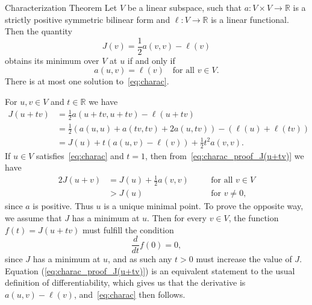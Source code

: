 
\begin{thmx}{Characterization Theorem}
    Let $V$ be a linear subspace, such that
        \(
            a: V \times V \rightarrow \mathbb{R}
        \) 
    is a strictly positive symmetric bilinear form
     and
        \(
            \ell: V \rightarrow \mathbb{R}
        \)
    is a linear functional. Then the quantity
        \[
            J(v)=\frac{1}{2} a(v,v) - \ell(v)
        \]
    obtains its minimum over $V$ at $u$ if and only if
        \begin{equation}
            a(u,v) = \ell(v) \quad \text{for all } v \in V.
        \label{eq:charac}
        \end{equation}
    There is at most one solution to~\eqref{eq:charac}.\label{thm:charac_theorem}
\end{thmx}

\begin{bev}
    For $u,v \in V$ and $t \in \mathbb{R}$ we have
    \begin{align}
        J(u+tv) &= \frac{1}{2} a(u+tv,u+tv) - \ell(u+tv) \nonumber \\
        &= \frac{1}{2} \left( a(u,u) + a(tv,tv) + 2a(u,tv) \right) - \left(  \ell(u) + \ell(tv)\right) \nonumber \\
        &= J(u) + t\left( a(u,v) - \ell(v) \right) + \frac{1}{2}t^2a(v,v). \label{eq:charac_proof_J(u+tv)}
    \end{align}
    If $u \in V$ satisfies~\eqref{eq:charac} and $t=1$, then from~\eqref{eq:charac_proof_J(u+tv)} we have
    \begin{alignat}{2}
        J(u+v) &= J(u) + \frac{1}{2}a(v,v) \quad &&\text{for all } v\in V  \nonumber \\
        &> J(u) \quad &&\text{for } v \neq 0,
    \end{alignat}
    since $a$ is positive.
    Thus $u$ is a unique minimal point. 
    To prove the opposite way, we assume that $J$ has a minimum at $u$.
    Then for every $v\in V$, the function $f(t)= J(u+tv)$ must fulfill the condition
    \begin{equation*}
        \frac{d}{dt}f(0) = 0,
    \end{equation*}
    since $J$ has a minimum at $u$, and as such any $t>0$ must increase the 
    value of $J$.
    Equation (\ref{eq:charac_proof_J(u+tv)}) is an equivalent statement to 
    the usual definition of differentiability, which gives us that 
     the derivative is $a(u,v) - \ell(v)$, and~\eqref{eq:charac} then follows.
\end{bev}